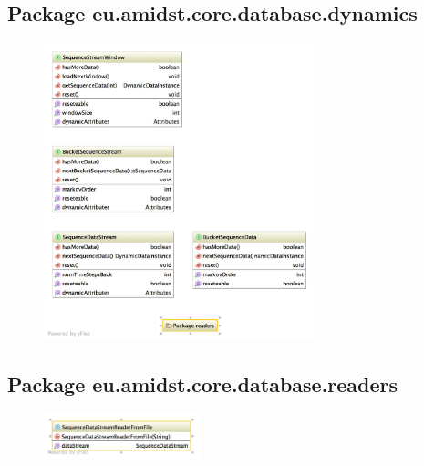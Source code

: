 \subsection{Package eu.amidst.core.database.dynamics}
\begin{figure}[H]
  \centering
    \includegraphics[width=0.7\textwidth]{ClassDiagrams/core_database_dynamics.jpg}
\end{figure}


\subsection{Package eu.amidst.core.database.readers}
\begin{figure}[H]
  \centering
    \includegraphics[width=0.4\textwidth]{ClassDiagrams/core_database_dynamics_readers.jpg}
\end{figure}

